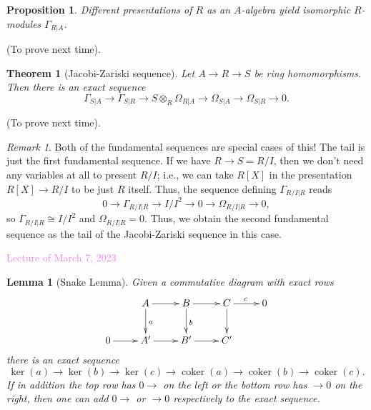 \documentclass{amsart}[12pt]
\def\ker{\operatorname{ker}}
\def\coker{\operatorname{coker}}
\newcommand{\Mar}[1]{\textcolor{violet}{Lecture of March #1, 2023}}
\numberwithin{equation}{section}
\theoremstyle{plain} %
\newtheorem{thm}[equation]{Theorem}
\newtheorem{lem}[equation]{Lemma}
\newtheorem{prop}[equation]{Proposition}
\theoremstyle{definition}
\theoremstyle{remark}
\newtheorem{rem}[equation]{Remark}
\begin{document}
\begin{prop} Different presentations of $R$ as an $A$-algebra yield isomorphic $R$-modules $\Gamma_{R|A}$.
\end{prop}

(To prove next time).

\begin{thm}[Jacobi-Zariski sequence]
Let $A\to R \to S$ be ring homomorphisms. Then there is an exact sequence
\[ \Gamma_{S|A} \to \Gamma_{S|R} \to S\otimes_R \Omega_{R|A} \to \Omega_{S|A} \to \Omega_{S|R} \to 0.\]
\end{thm}

(To prove next time).


\begin{rem}
Both of the fundamental sequences are special cases of this! The tail is just the first fundamental sequence. If we have $R\to S=R/I$, then we don't need any variables at all to present $R/I$; i.e., we can take $R[X]$ in the presentation $R[X]\to R/I$ to be just $R$ itself. Thus, the sequence defining $\Gamma_{R/I | R}$ reads
\[ 0 \to \Gamma_{R/I | R} \to  I/I^2 \to 0 \to \Omega_{R/I | R} \to 0,\]
so $\Gamma_{R/I | R}\cong I/I^2$ and $\Omega_{R/I | R}=0$. Thus, we obtain the second fundamental sequence as
the tail of the Jacobi-Zariski sequence in this case.
\end{rem}

\Mar{7}

\begin{lem}[Snake Lemma]
Given a commutative diagram with exact rows
\[ \xymatrix{ & A \ar[r] \ar[d]^{a} & B \ar[r] \ar[d]^{b}& C \ar[r]^{c} \ar[d]& 0 \\ 0\ar[r]& A' \ar[r] & B' \ar[r] & C'  & }\]
there is an exact sequence
\[  \ker(a) \to \ker(b) \to \ker(c) \to \coker(a)\to \coker(b) \to \coker(c).\]
If in addition the top row has $0\to$ on the left or the bottom row has $\to 0$ on the right, then one can add $0\to$ or $\to 0$ respectively to the exact sequence.
\end{lem}
\end{document}
